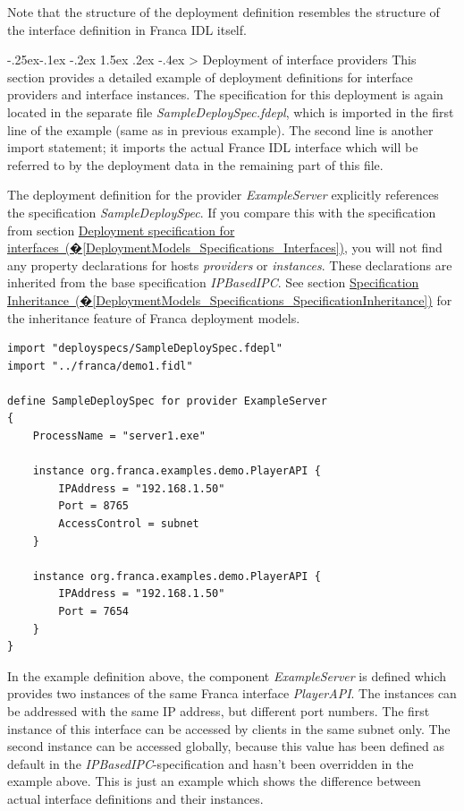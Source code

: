 \documentclass[a4paper,10pt]{scrreprt}
\makeatletter
\renewcommand\subsection{\medskip\@startsection{subsection}{2}{\z@}%
  {-.25ex\@plus -.1ex \@minus -.2ex}%
  {1.5ex \@plus .2ex \@minus -.4ex}%
  {\ifnum \scr@compatibility>\@nameuse{scr@v@2.96}\relax
    \setlength{\parfillskip}{\z@ plus 1fil}\fi
    \raggedsection\normalfont\sectfont\nobreak\size@subsection
  }%
}
\makeatother
\begin{document}
Note that the structure of the deployment definition resembles the structure of
the interface definition in Franca IDL itself.

\subsection{Deployment of interface providers}
\label{DeploymentModels_Definitions_Providers}
This section provides a detailed example of deployment definitions for interface
providers and interface instances. The specification for this deployment is again
located in the separate file \textit{SampleDeploySpec.fdepl}, which is imported in
the first line of the example (same as in previous example). The second line is
another import statement; it imports the actual France IDL interface which
will be referred to by the deployment data in the remaining part of this file.

The deployment definition for the provider \textit{ExampleServer} explicitly references
the specification \textit{SampleDeploySpec}. If you compare this with 
the specification from section
\hyperref[DeploymentModels_Specifications_Interfaces]{Deployment specification for interfaces~(�\ref*{DeploymentModels_Specifications_Interfaces})},
you will not find any property declarations for hosts \textit{providers} or \textit{instances}. 
These declarations are inherited from the base specification \textit{IPBasedIPC}. 
See section \hyperref[DeploymentModels_Specifications_SpecificationInheritance]{Specification Inheritance~(�\ref*{DeploymentModels_Specifications_SpecificationInheritance})}
for the inheritance feature of Franca deployment models.


\begin{lstlisting}[language=FDeploy]
import "deployspecs/SampleDeploySpec.fdepl"
import "../franca/demo1.fidl"

define SampleDeploySpec for provider ExampleServer
{
	ProcessName = "server1.exe"
	
	instance org.franca.examples.demo.PlayerAPI {
		IPAddress = "192.168.1.50"
		Port = 8765
		AccessControl = subnet
	}	

	instance org.franca.examples.demo.PlayerAPI {
		IPAddress = "192.168.1.50"
		Port = 7654
	}
}
\end{lstlisting}

In the example definition above, the component \textit{ExampleServer} is defined which provides
two instances of the same Franca interface \textit{PlayerAPI}. The instances can be addressed
with the same IP address, but different port numbers. The first instance of this interface
can be accessed by clients in the same subnet only. The second instance can be accessed
globally, because this value has been defined as default in the \textit{IPBasedIPC}-specification
and hasn't been overridden in the example above. This is just an example which shows the
difference between actual interface definitions and their instances.  
\end{document}
